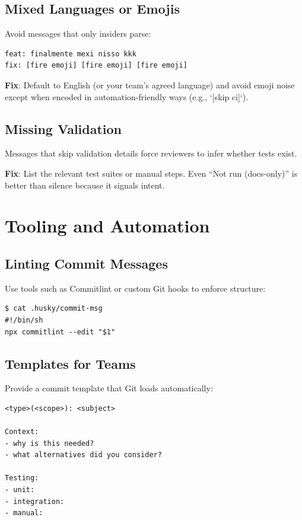 \subsection{Mixed Languages or Emojis}
Avoid messages that only insiders parse:
\begin{lstlisting}[style=markdown]
feat: finalmente mexi nisso kkk
fix: [fire emoji] [fire emoji] [fire emoji]
\end{lstlisting}

\textbf{Fix}: Default to English (or your team's agreed language) and avoid emoji noise except when encoded in automation-friendly ways (e.g., `[skip ci]`).

\subsection{Missing Validation}
Messages that skip validation details force reviewers to infer whether tests exist.

\textbf{Fix}: List the relevant test suites or manual steps. Even ``Not run (docs-only)'' is better than silence because it signals intent.

\section{Tooling and Automation}
\subsection{Linting Commit Messages}
Use tools such as Commitlint or custom Git hooks to enforce structure:
\begin{lstlisting}[style=shell,caption={Enforcing message style in pre-commit}]
$ cat .husky/commit-msg
#!/bin/sh
npx commitlint --edit "$1"
\end{lstlisting}

\subsection{Templates for Teams}
Provide a commit template that Git loads automatically:
\begin{lstlisting}[style=markdown,caption={.gitmessage template snippet}]
<type>(<scope>): <subject>

Context:
- why is this needed?
- what alternatives did you consider?

Testing:
- unit:
- integration:
- manual:
\end{lstlisting}

